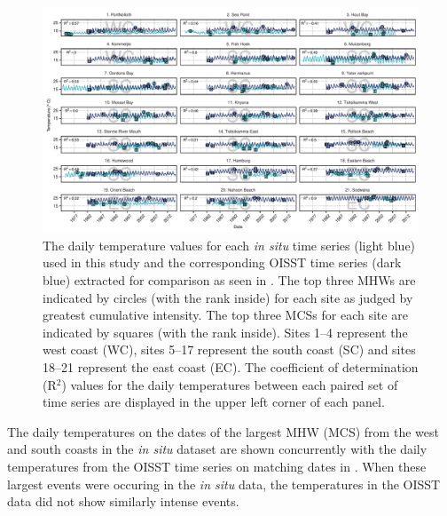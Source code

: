 \documentclass[a4paper,10pt,review]{elsarticle}
\begin{document}
\begin{figure}
\centering
\includegraphics[width=1.0\textwidth]{figure2.pdf}
\caption{The daily temperature values for each \emph{in situ} time series (light blue) used in this study and the corresponding OISST time series (dark blue) extracted for comparison as seen in . The top three MHWs are indicated by circles (with the rank inside) for each site as judged by greatest cumulative intensity. The top three MCSs for each site are indicated by squares (with the rank inside). Sites 1--4 represent the west coast (WC), sites 5--17 represent the south coast (SC) and sites 18--21 represent the east coast (EC). The coefficient of determination (R$^2$) values for the daily temperatures between each paired set of time series are displayed in the upper left corner of each panel.}
\label{fig:Figure2}
\end{figure}

The daily temperatures on the dates of the largest MHW (MCS) from the west and south coasts in the \emph{in situ} dataset are shown concurrently with the daily temperatures from the OISST time series on matching dates in . When these largest events were occuring in the \emph{in situ} data, the temperatures in the OISST data did not show similarly intense events.
\end{document}
